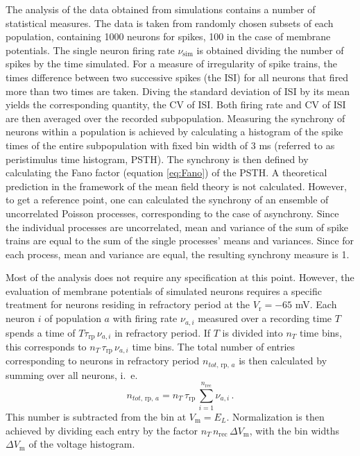 The analysis of the data obtained from simulations contains a number of 
statistical measures. The data is taken from randomly chosen subsets of each population, 
containing 1000 neurons for spikes, 100 in the case of membrane potentials. 
The single neuron firing rate $\nu_\text{sim}$ is 
obtained dividing the number of spikes by the time simulated. 
For a measure of irregularity of spike trains, the times difference
between two successive spikes (the ISI) for all neurons that fired more than two times 
are taken. Diving the standard deviation of ISI by its mean
yields the corresponding quantity, the CV of ISI. Both firing rate and CV of ISI 
are then averaged over the recorded subpopulation. 
Measuring the synchrony of neurons within a population is achieved by 
calculating a histogram of the spike times of the entire subpopulation
with fixed bin width of $3$ ms (referred to as peristimulus time histogram, PSTH).
The synchrony is then defined by calculating the Fano factor (equation
\eqref{eq:Fano}) of the PSTH.
A theoretical prediction in the framework of the mean field theory is not calculated. 
However, to get a reference point, one can calculated the synchrony of an ensemble 
of uncorrelated Poisson processes, corresponding to the case of asynchrony. 
Since the individual processes are uncorrelated, mean and variance of the sum of 
spike trains are equal to the sum of the single processes' means and variances. 
Since for each process, mean and variance are equal, the resulting synchrony measure is 1. 







Most of the analysis does not require any specification at this point. 
However, the evaluation of membrane potentials of simulated neurons requires a specific treatment 
for neurons residing in refractory period at the $V_\text{r} = -65$ mV. 
Each neuron $i$ of population $a$ with firing rate $\nu_{a, i}$ measured over 
a recording time $T$ spends a time of \:$T \tau_\text{rp} \,\nu_{a, i}$\: in refractory 
period. If $T$ is divided into $n_T$ time bins, this corresponds to 
$n_T \, \tau_\text{rp} \,\nu_{a, i}$ time bins. The total number of entries 
corresponding to neurons in refractory period $n_{tot, \,\text{rp}, \,a}$ is then 
calculated by summing over all neurons, i.~e.
\begin{equation}
    n_{tot, \,\text{rp}, \,a}
        = n_T \, \tau_\text{rp} \,\sum_{i = 1}^{n_\text{rec}}\nu_{a, i} \, .
    \label{eq:n_tot_rp}
\end{equation}
This number is subtracted from the bin at $V_\text{m} = E_L$. Normalization is then
achieved by dividing each entry by the factor $n_T \, n_\text{rec} \, \Delta V_\text{m}$, 
with the bin widths $\Delta V_\text{m}$ of the voltage histogram.

